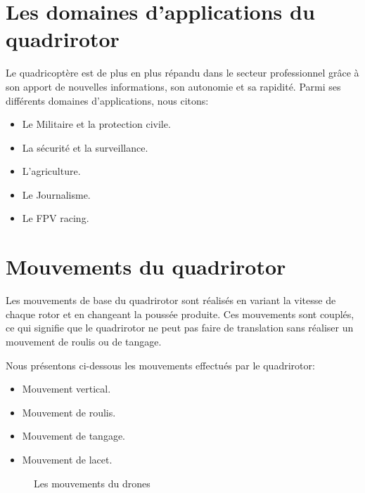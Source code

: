 	\section{Les domaines d'applications du quadrirotor}
	
	Le quadricoptère est de plus en plus répandu dans le secteur professionnel grâce à son apport de nouvelles informations, son autonomie et sa rapidité. Parmi ses différents domaines d'applications, nous citons: 
	
	\begin{itemize}
		
		\item Le Militaire et la protection civile.
		\item La sécurité et la surveillance.
		\item L'agriculture.
		\item Le Journalisme.
		\item Le FPV racing.
		
	\end{itemize}
	\newpage
	\section{Mouvements du quadrirotor}
	Les mouvements de base du quadrirotor sont réalisés en variant la vitesse de chaque rotor et en changeant la poussée produite. Ces mouvements sont couplés, ce qui signifie que le quadrirotor ne peut pas faire de translation sans réaliser un mouvement de roulis ou de tangage.
	
	Nous présentons ci-dessous les mouvements effectués par le quadrirotor:		
	\begin{itemize}
		\item Mouvement vertical.
		\item Mouvement de roulis.
		\item Mouvement de tangage.
		\item Mouvement de lacet.
	\end{itemize}
	\begin{figure} [h]
	\begin{center}
		\centering
	\end{center}
	\caption{Les mouvements du drones }
	\end{figure}

